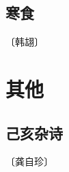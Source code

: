 \documentclass[12pt,UTF-8,openany]{ctexbook}
\begin{document}
\vspace{8pt}


\section{寒食}

\begin{center}
    \vspace{10pt}
    
    \begin{normalsize}
        
        〔韩翃〕
        
    \end{normalsize}
    
    \vspace{8pt}
    
    \begin{large}
        
        
        
    \end{large}
    
\end{center}

\vspace{8pt}


\chapter{其他}

\section{己亥杂诗}

\begin{center}
    \vspace{10pt}
    
    \begin{normalsize}
        
        〔龚自珍〕
        
    \end{normalsize}
    
    \vspace{8pt}
    
    \begin{large}
        
        
        
    \end{large}
    
\end{center}
\end{document}
